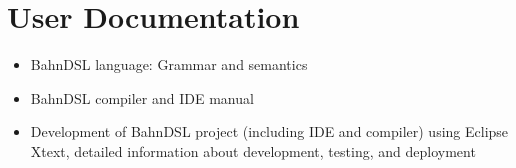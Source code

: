 \documentclass[a4paper,11pt]{scrreprt}
\begin{document}
\section{User Documentation}
\begin{itemize}
    \item BahnDSL language: Grammar and semantics
    \item BahnDSL compiler and IDE manual
    \item Development of BahnDSL project (including IDE and compiler) using Eclipse Xtext, detailed information about development, testing, and deployment
\end{itemize}




\end{document}

